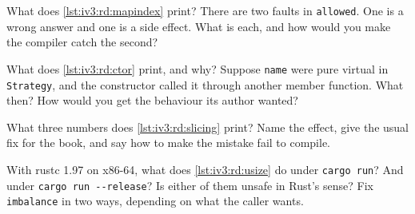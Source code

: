 \begin{question}\label{iq:iv3:reading-debugging-and-software-design:4}
What does \cref{lst:iv3:rd:mapindex} print? There are two faults in \texttt{allowed}. One is a wrong answer and one is a side effect. What is each, and how would you make the compiler catch the second?
\label{lst:iv3:rd:mapindex}
\end{question}

\begin{question}\label{iq:iv3:reading-debugging-and-software-design:5}
What does \cref{lst:iv3:rd:ctor} print, and why? Suppose \texttt{name} were pure virtual in \texttt{Strategy}, and the constructor called it through another member function. What then? How would you get the behaviour its author wanted?
\label{lst:iv3:rd:ctor}
\end{question}

\begin{question}\label{iq:iv3:reading-debugging-and-software-design:6}
What three numbers does \cref{lst:iv3:rd:slicing} print? Name the effect, give the usual fix for the book, and say how to make the mistake fail to compile.
\label{lst:iv3:rd:slicing}
\end{question}

\begin{question}\label{iq:iv3:reading-debugging-and-software-design:7}
With rustc 1.97 on x86-64, what does \cref{lst:iv3:rd:usize} do under \texttt{cargo run}? And under \texttt{cargo run -{}-release}? Is either of them unsafe in Rust's sense? Fix \texttt{imbalance} in two ways, depending on what the caller wants.
\label{lst:iv3:rd:usize}
\end{question}

